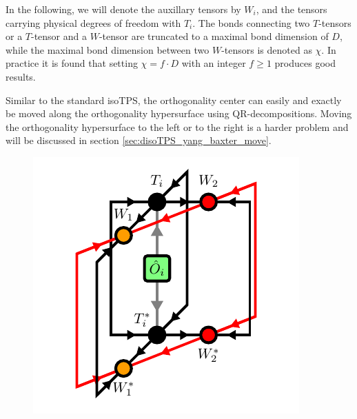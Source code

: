 In the following, we will denote the auxillary tensors by $W_i$, and the tensors carrying physical degrees of freedom with $T_i$. The bonds connecting two $T$-tensors or a $T$-tensor and a $W$-tensor are truncated to a maximal bond dimension of $D$, while the maximal bond dimension between two $W$-tensors is denoted as $\chi$. In practice it is found that setting $\chi=f\cdot D$ with an integer $f\ge1$ produces good results. \par
Similar to the standard isoTPS, the orthogonality center can easily and exactly be moved along the orthogonality hypersurface using QR-decompositions. Moving the orthogonality hypersurface to the left or to the right is a harder problem and will be discussed in section \ref{sec:disoTPS_yang_baxter_move}. \par
\begin{figure}
	\centering
	\subcaptionbox{\label{fig:disoTPS_onesite_expectation_value_environment}}
	{%
		\usebox{\largestimage}
	}
	\quad\quad
	\subcaptionbox{\label{fig:disoTPS_onesite_expectation_value_computation}}
	{%
		\raisebox{\dimexpr.5\ht\largestimagea-.5\height}
		{%
			\includegraphics[scale=1.0]{figures/tikz/disoTPS/one_site_expectation_value/one_site_expectation_value_b.pdf}
}}
\end{figure}
